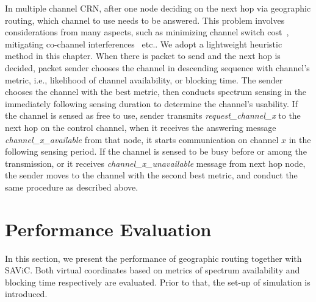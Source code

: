In multiple channel CRN, after one node deciding on the next hop via geographic routing, which channel to use needs to be answered.
This problem involves considerations from many aspects, such as minimizing channel switch cost~\cite{spectrumDecision_2013mass}, mitigating co-channel interferences~\cite{DySpAN12_Di} etc..
We adopt a lightweight heuristic method in this chapter. 
When there is packet to send and the next hop is decided, packet sender chooses the channel in descending sequence with channel's metric, i.e., likelihood of channel availability, or blocking time.
The sender chooses the channel with the best metric, then conducts spectrum sensing in the immediately following sensing duration to determine the channel's usability.
If the channel is sensed as free to use, sender transmits \textit{request\_channel\_x} to the next hop on the control channel, when it receives the answering message \textit{channel\_x\_available} from that node, it starts communication on channel $x$ in the following sensing period.
If the channel is sensed to be busy before or among the transmission, or it receives \textit{channel\_x\_unavailable} message from next hop node, the sender moves to the channel with the second best metric, and conduct the same procedure as described above.




\section{Performance Evaluation}
In this section, we present the performance of geographic routing together with SAViC.
Both virtual coordinates based on metrics of spectrum availability and blocking time respectively are evaluated.
Prior to that, the set-up of simulation is introduced.


